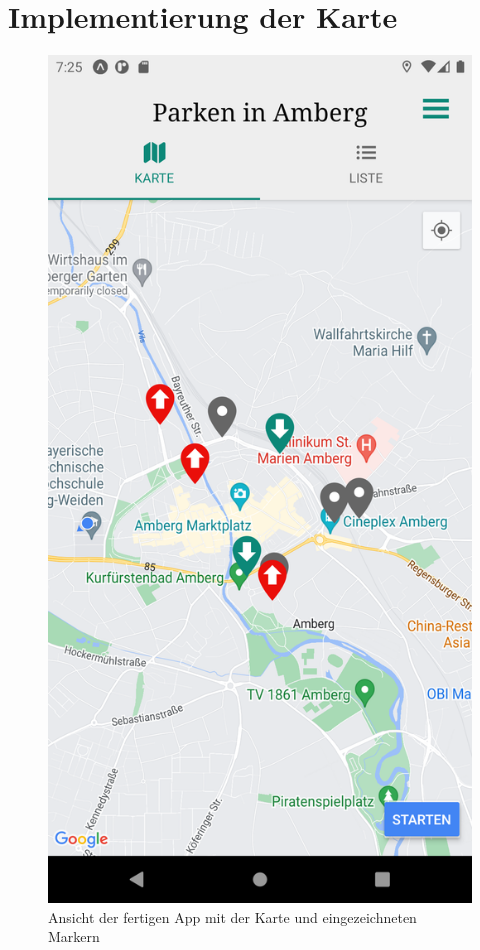 \chapter{Implementierung der Karte}
\label{chap:3}

\begin{figure}
	\vspace{-\baselineskip}
	\centering
	\includegraphics[scale=0.15]{img/map}
	\caption{Ansicht der fertigen App mit der Karte und eingezeichneten Markern}
	\label{fig:map}
\end{figure}
